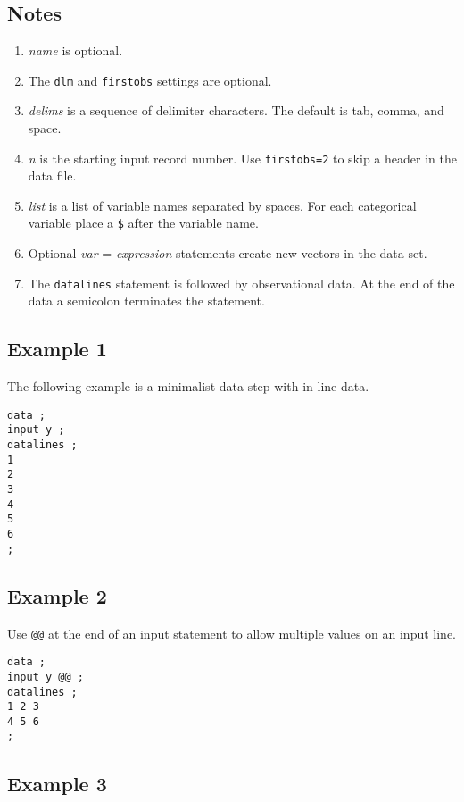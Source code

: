 \documentclass[12pt]{article}
\begin{document}
\subsection*{Notes}

\begin{enumerate}
\item
{\it name} is optional.
\item
The {\tt dlm} and {\tt firstobs} settings are optional.
\item
{\it delims} is a sequence of delimiter characters.
The default is tab, comma, and space.
\item
{\it n} is the starting input record number.
Use {\tt firstobs=2} to skip a header in the data file.
\item
{\it list} is a list of variable names separated by spaces.
For each categorical variable place a {\tt\$} after the variable name.
\item
Optional {\it var} = {\it expression} statements
create new vectors in the data set.
\item
The {\tt datalines} statement is followed by observational data.
At the end of the data a semicolon terminates the statement.
\end{enumerate}

\subsection*{Example 1}

The following example is a minimalist data step with in-line data.

{\scriptsize\begin{verbatim}
data ;
input y ;
datalines ;
1
2
3
4
5
6
;
\end{verbatim}}

\subsection*{Example 2}

Use \verb$@@$ at the end of an input statement to allow multiple
values on an input line.

{\scriptsize\begin{verbatim}
data ;
input y @@ ;
datalines ;
1 2 3
4 5 6
;
\end{verbatim}}

\subsection*{Example 3}
\end{document}
